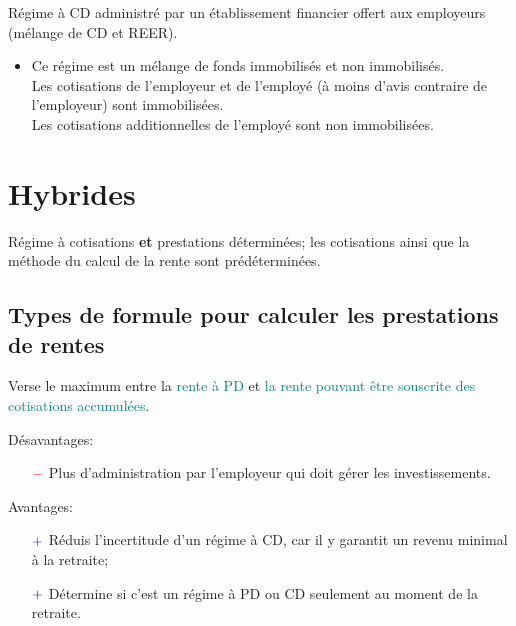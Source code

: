\documentclass[10pt, french]{article}
\begin{document}
\begin{multicols*}{3}
\begin{definitionNOHFILL}
Régime à CD administré par un établissement financier offert aux employeurs (mélange de CD et REER).

\begin{itemize}[leftmargin = *]
	\item	Ce régime est un mélange de fonds immobilisés et non immobilisés. \\
			Les cotisations de l'employeur et de l'employé (à moins d’avis contraire de l’employeur) sont immobilisées. \\
			Les cotisations additionnelles de l'employé sont non immobilisées.
\end{itemize}
\end{definitionNOHFILL}

\newpage

\section*{Hybrides}

\begin{definitionNOHFILL}[Description]
Régime à cotisations \textbf{et} prestations déterminées; les cotisations ainsi que la méthode du calcul de la rente sont prédéterminées.
\end{definitionNOHFILL}

\subsection*{Types de formule pour calculer les prestations de rentes}

\begin{definitionNOHFILL}
Verse le maximum entre la \textcolor{teal}{rente à PD} et \textcolor{teal}{la rente pouvant être souscrite des cotisations accumulées}.


Désavantages:
\begin{itemize}
	\item[$\color{red}-$]	Plus d'administration par l'employeur qui doit gérer les investissements.
\end{itemize}

Avantages:
\begin{itemize}
	\item[$\color{blue}+$]	Réduis l'incertitude d'un régime à CD, car il y garantit un revenu minimal à la retraite;
	\item[$\color{blue}+$]	Détermine si c'est un régime à PD ou CD seulement au moment de la retraite.
\end{itemize}
\end{definitionNOHFILL}


\end{multicols*}
\end{document}
